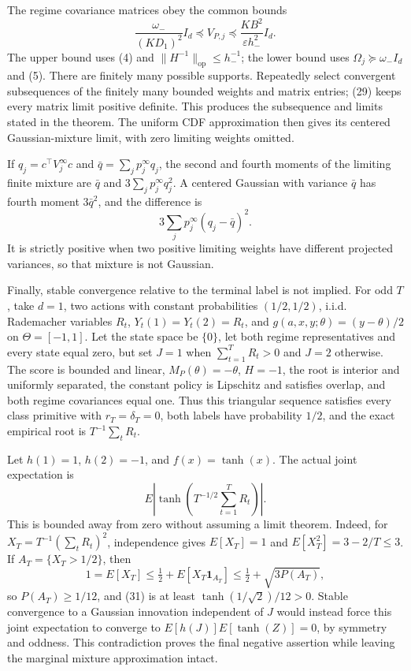 The regime covariance matrices obey the common bounds
\[
 \frac{\omega_-}{(KD_1)^2}I_d\preceq V_{P,j}
 \preceq\frac{KB^2}{\varepsilon h_-^2}I_d. \tag{29}
\]
The upper bound uses (4) and \(\|H^{-1}\|_{\mathrm{op}}\le h_-^{-1}\); the lower bound uses \(\Omega_j\succeq\omega_-I_d\) and (5). There are finitely many possible supports. Repeatedly select convergent subsequences of the finitely many bounded weights and matrix entries; (29) keeps every matrix limit positive definite. This produces the subsequence and limits stated in the theorem. The uniform CDF approximation then gives its centered Gaussian-mixture limit, with zero limiting weights omitted.

If \(q_j=c^\top V_j^\infty c\) and \(\bar q=\sum_jp_j^\infty q_j\), the second and fourth moments of the limiting finite mixture are \(\bar q\) and \(3\sum_jp_j^\infty q_j^2\). A centered Gaussian with variance \(\bar q\) has fourth moment \(3\bar q^2\), and the difference is
\[
 3\sum_jp_j^\infty(q_j-\bar q)^2. \tag{30}
\]
It is strictly positive when two positive limiting weights have different projected variances, so that mixture is not Gaussian.

Finally, stable convergence relative to the terminal label is not implied. For odd \(T\), take \(d=1\), two actions with constant probabilities \((1/2,1/2)\), i.i.d. Rademacher variables \(R_t\), \(Y_t(1)=Y_t(2)=R_t\), and \(g(a,x,y;\theta)=(y-\theta)/2\) on \(\Theta=[-1,1]\). Let the state space be \(\{0\}\), let both regime representatives and every state equal zero, but set \(J=1\) when \(\sum_{t=1}^TR_t>0\) and \(J=2\) otherwise. The score is bounded and linear, \(M_P(\theta)=-\theta\), \(H=-1\), the root is interior and uniformly separated, the constant policy is Lipschitz and satisfies overlap, and both regime covariances equal one. Thus this triangular sequence satisfies every class primitive with \(r_T=\delta_T=0\), both labels have probability \(1/2\), and the exact empirical root is \(T^{-1}\sum_tR_t\).

Let \(h(1)=1\), \(h(2)=-1\), and \(f(x)=\tanh(x)\). The actual joint expectation is
\[
 E\left|\tanh\left(T^{-1/2}\sum_{t=1}^TR_t\right)\right|. \tag{31}
\]
This is bounded away from zero without assuming a limit theorem. Indeed, for \(X_T=T^{-1}(\sum_tR_t)^2\), independence gives \(E[X_T]=1\) and \(E[X_T^2]=3-2/T\le3\). If \(A_T=\{X_T>1/2\}\), then
\[
 1=E[X_T]\le\tfrac12+E[X_T\mathbf 1_{A_T}]
 \le\tfrac12+\sqrt{3P(A_T)},
\]
so \(P(A_T)\ge1/12\), and (31) is at least \(\tanh(1/\sqrt2)/12>0\). Stable convergence to a Gaussian innovation independent of \(J\) would instead force this joint expectation to converge to \(E[h(J)]E[\tanh(Z)]=0\), by symmetry and oddness. This contradiction proves the final negative assertion while leaving the marginal mixture approximation intact.